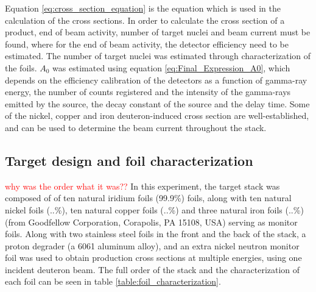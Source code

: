 \noindent 

\noindent 
Equation \ref{eq:cross_section_equation} is the equation which is used in the calculation of the cross sections. In order to calculate the cross section of a product, end of beam activity, number of target nuclei and beam current must be found, where for the end of beam activity, the detector efficiency need to be estimated. The number of target nuclei was estimated through characterization of the foils. $A_0$ was estimated using equation \ref{eq:Final_Expression_A0}, which depends on the efficiency calibration of the detectors as a function of gamma-ray energy, the number of counts registered and the intensity of the gamma-rays emitted by the source, the decay constant of the source and the delay time. Some of the nickel, copper and iron deuteron-induced cross section are well-established, and can  be used to determine the beam current throughout the stack. 






\subsection{Target design and foil characterization}
\textcolor{red}{why was the order what it was??}
In this experiment, the target stack was composed of of ten natural iridium foils (99.9\%) foils, along with ten natural nickel foils (..\%), ten natural copper foils (..\%) and three natural iron foils (..\%) (from Goodfellow Corporation, Corapolis, PA 15108, USA) serving as monitor foils. Along with two stainless steel foils in the front and the back of the stack, a proton degrader (a 6061 aluminum alloy), and an extra nickel neutron monitor foil was used to obtain production cross sections at multiple energies, using one incident deuteron beam. The full order of the stack and the characterization of each foil can be seen in table \ref{table:foil_characterization}. \\

